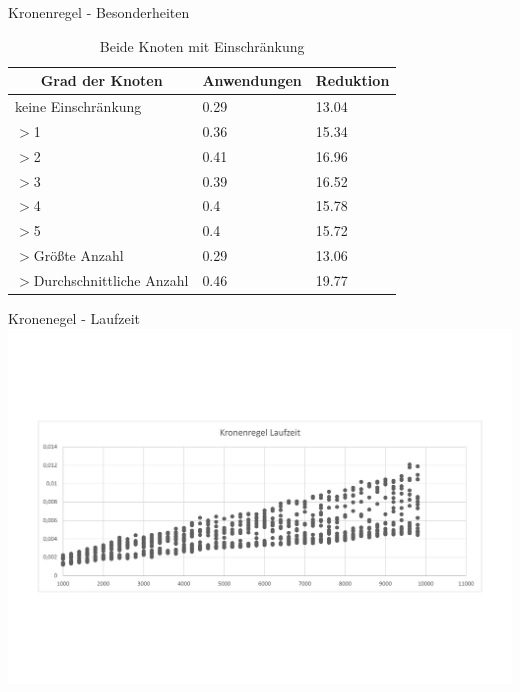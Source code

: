 \documentclass{beamer}
\begin{document}
\begin{frame}{Kronenregel - Besonderheiten}
\begin{table}[htb]
\caption{Beide Knoten mit Einschränkung\label{tab:degreeAND}}
\vspace*{1em}
\centering

\bgroup
\def\arraystretch{1.3}%

\begin{tabular}[c]{l|l|l}
	
	\multicolumn{1}{c|}{\textbf{Grad der Knoten}} & 
	\multicolumn{1}{c|}{\textbf{Anwendungen}} & 
	\multicolumn{1}{c}{\textbf{Reduktion}} \\ 
	
	\hline

	keine Einschränkung&0.29&13.04\\
	$>$1&0.36 &15.34 \\
	$>$2&0.41 &16.96 \\
	$>$3& 0.39& 16.52 \\
	$>$4& 0.4 &15.78 \\
	$>$5& 0.4 & 15.72\\ \pause
	$>$Größte Anzahl& 0.29 &13.06 \\
	$>$Durchschnittliche Anzahl& 0.46&19.77 \\
	
\end{tabular}
\egroup

\end{table}
\end{frame}

\begin{frame}{Kronenegel - Laufzeit}
\includegraphics[scale= .4]{analysis1000_CrownNormal_runtime.pdf} 
\end{frame}
\end{document}
